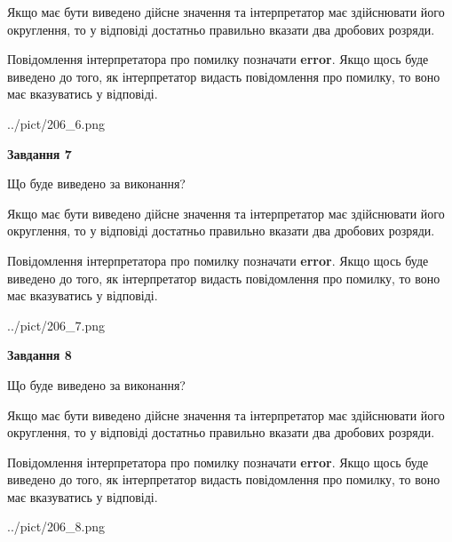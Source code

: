 \documentclass[12pt, ukrainian]{article}
\begin{document}
{\begin {Large}
Якщо має бути виведено дійсне значення та інтерпретатор має здійснювати його округлення, 
то у відповіді достатньо правильно вказати два дробових розряди.

Повідомлення інтерпретатора про помилку позначати \textbf{error}.
Якщо щось буде виведено до того, як інтерпретатор видасть повідомлення про помилку, 
то воно має вказуватись у відповіді. \par

\begin{center}
	{../pict/206_6.png}
\end{center}
\newpage

{\begin {center}\textbf{Завдання 7}\end {center}}\par
Що буде виведено за виконання? \par

Якщо має бути виведено дійсне значення та інтерпретатор має здійснювати його округлення, 
то у відповіді достатньо правильно вказати два дробових розряди.

Повідомлення інтерпретатора про помилку позначати \textbf{error}.
Якщо щось буде виведено до того, як інтерпретатор видасть повідомлення про помилку, 
то воно має вказуватись у відповіді. \par

\begin{center}
	{../pict/206_7.png}
\end{center}
\newpage

{\begin {center}\textbf{Завдання 8}\end {center}}\par
Що буде виведено за виконання? \par

Якщо має бути виведено дійсне значення та інтерпретатор має здійснювати його округлення, 
то у відповіді достатньо правильно вказати два дробових розряди.

Повідомлення інтерпретатора про помилку позначати \textbf{error}.
Якщо щось буде виведено до того, як інтерпретатор видасть повідомлення про помилку, 
то воно має вказуватись у відповіді. \par

\begin{center}
	{../pict/206_8.png}
\end{center}
\newpage


\end{Large}}
\end{document}
